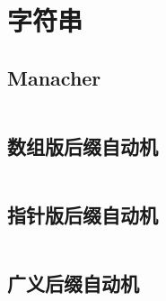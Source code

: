 \chapter{字符串}
\section{Manacher}
\inputminted{cpp}{\source/string/manacher.cpp}
\section{数组版后缀自动机}
\inputminted{cpp}{\source/string/SuffixAutomaton_array.cpp}
\section{指针版后缀自动机}
\inputminted{cpp}{\source/string/SuffixAutomaton_pointer.cpp}
\section{广义后缀自动机}
\inputminted{cpp}{\source/string/EX_SuffixAutomaton_pointer.cpp}